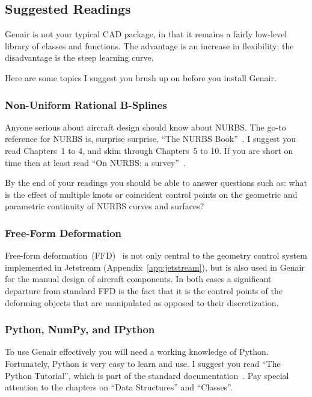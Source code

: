 \documentclass[]{article}
\begin{document}
\subsection{Suggested Readings}

Genair is not your typical CAD package, in that it remains a fairly 
low-level library of classes and functions.  The advantage is an 
increase in flexibility; the disadvantage is the steep learning curve.

Here are some topics I suggest you brush up on before you install 
Genair.

\subsubsection{Non-Uniform Rational B-Splines}

Anyone serious about aircraft design should know about NURBS.  The go-to 
reference for NURBS is, surprise surprise, ``The NURBS 
Book''~\cite{Piegl1997}.  I suggest you read Chapters~1 to 4, and skim 
through Chapters~5 to 10.  If you are short on time then at least read 
``On NURBS: a survey''~\cite{Piegl1991}.

By the end of your readings you should be able to answer questions such 
as: what is the effect of multiple knots or coincident control points on 
the geometric and parametric continuity of NURBS curves and surfaces?

\subsubsection{Free-Form Deformation}

Free-form deformation~(FFD)~\cite{Sederberg1986} is not only central to 
the geometry control system implemented in Jetstream 
(Appendix~\ref{app:jetstream}), but is also used in Genair for the 
manual design of aircraft components.  In both cases a significant 
departure from standard FFD is the fact that it is the control points of 
the deforming objects that are manipulated as opposed to their 
discretization.

\subsubsection{Python, NumPy, and IPython}

To use Genair effectively you will need a working knowledge of Python.  
Fortunately, Python is very easy to learn and use.  I suggest you read 
``The Python Tutorial'', which is part of the standard 
documentation~\cite{python}.  Pay special attention to the chapters on 
``Data Structures'' and ``Classes''.
\end{document}

